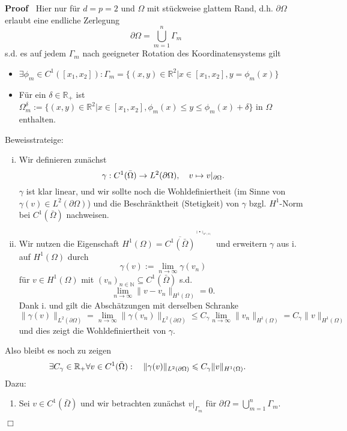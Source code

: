 \documentclass{book}
\newcommand{\assign}{:=}
\newcommand{\nobracket}{}
\newenvironment{enumeratealpha}{\begin{enumerate}[a{\textup{)}}] }{\end{enumerate}}
\newenvironment{enumerateroman}{\begin{enumerate}[i.] }{\end{enumerate}}
\newenvironment{itemizedot}{\begin{itemize} \renewcommand{\labelitemi}{$\bullet$}\renewcommand{\labelitemii}{$\bullet$}\renewcommand{\labelitemiii}{$\bullet$}\renewcommand{\labelitemiv}{$\bullet$}}{\end{itemize}}
\newenvironment{proof}{\noindent\textbf{Proof\ }}{\hspace*{\fill}$\Box$\medskip}
\begin{document}
\begin{proof}
  Hier nur f{\"u}r $d = p = 2$ und $\Omega$ mit st{\"u}ckweise glattem Rand,
  d.h. $\partial \Omega$ erlaubt eine endliche Zerlegung
  \[ \partial \Omega = \bigcup_{m = 1}^n \Gamma_m \]
  s.d. es auf jedem $\Gamma_m$ nach geeigneter Rotation des Koordinatensystems
  gilt
  \begin{itemizedot}
    \item $\exists \phi_m \in C^1 ([x_1, x_2]) :$\quad$\Gamma_m = \{ (x, y)
    \in \mathbb{R}^2  | \nobracket x \in [x_1, x_2], y = \phi_m (x) \}$
    
    \item F{\"u}r ein $\delta \in \mathbb{R}_+$ ist $\Omega^{\delta}_m \assign
    \{ (x, y) \in \mathbb{R}^2  | \nobracket x \in [x_1, x_2], \phi_m (x)
    \leqslant y \leqslant \phi_m (x) + \delta \}$ in $\Omega$ enthalten.
    
    {\hspace{10em}}
  \end{itemizedot}
  Beweisstrateige:
  \begin{enumerateroman}
    \item Wir definieren zun{\"a}chst
    \[ \gamma : C^1 (\bar{\Omega}) \rightarrow L^2 (\partial \Omega),
       \text{\quad} v \mapsto v |_{\partial \Omega} \nobracket . \]
    $\gamma$ ist klar linear, und wir sollte noch die Wohldefiniertheit (im
    Sinne von $\gamma (v) \in L^2 (\partial \Omega)$) und die
    Beschr{\"a}nktheit (Stetigkeit) von $\gamma$ bzgl. $H^1$-Norm bei $C^1
    (\bar{\Omega})$ nachweisen.
    
    \item Wir nutzen die Eigenschaft $H^1 (\Omega) = \overline{C^1
    (\bar{\Omega})}^{^{^{\| \bullet \|_{H^1 (\Omega)}}}}$ und erweitern
    $\gamma$ aus i. auf $H^1 (\Omega)$ durch
    \[ \gamma (v) \assign \lim_{n \rightarrow \infty} \gamma (v_n) \]
    f{\"u}r $v \in H^1 (\Omega)$ mit $(v_n)_{n \in \mathbb{N}} \subseteq C^1
    (\bar{\Omega})$ s.d.
    \[ \lim_{n \rightarrow \infty} \| v - v_n \|_{H^1 (\Omega)} = 0. \]
    {\hspace{1.7em}}Dank i. und gilt die Absch{\"a}tzungen mit derselben
    Schranke
    \[ \| \gamma (v) \|_{L^2 (\partial \Omega)} = \lim_{n \rightarrow \infty}
       \| \gamma (v_n) \|_{L^2 (\partial \Omega)} \leqslant C_{\gamma} \lim_{n
       \rightarrow \infty} \| v_n \|_{H^1 (\Omega)} = C_{\gamma} \| v \|_{H^1
       (\Omega)} \]
    und dies zeigt die Wohldefiniertheit von $\gamma$.
  \end{enumerateroman}
  Also bleibt es noch zu zeigen
  \[ \exists C_{\gamma} \in \mathbb{R}_+ \forall v \in C^1 (\bar{\Omega}) :
     \text{\quad} \| \gamma (v) \|_{L^2 (\partial \Omega)} \leqslant
     C_{\gamma} \| v \|_{H^1 (\Omega)} . \text{\qquad} \]
  Dazu:
  \begin{enumeratealpha}
    \item Sei $v \in C^1 (\bar{\Omega})$ und wir betrachten zun{\"a}chst $v
    |_{\Gamma_m} \nobracket$ f{\"u}r $\partial \Omega = \bigcup_{m = 1}^n
    \Gamma_m$.
    

\end{enumeratealpha}
\end{proof}
\end{document}
